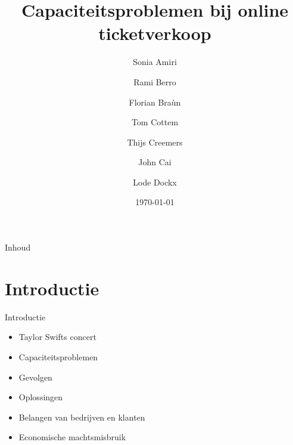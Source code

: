 \documentclass{beamer}
\title{Capaciteitsproblemen bij online ticketverkoop}
\author{Sonia Amiri \and Rami Berro \and Florian Braùn \and Tom Cottem \and Thijs Creemers \and John Cai \and Lode Dockx}
\date{\today}
\begin{document}
\begin{frame}
  \titlepage
\end{frame}

\begin{frame}{Inhoud}
  \tableofcontents
\end{frame}

\section[Intro]{Introductie}
\begin{frame}{Introductie}
    \begin{itemize}
        \item Taylor Swifts concert
        \item Capaciteitsproblemen
        \item Gevolgen
        \item Oplossingen
        \item Belangen van bedrijven en klanten
        \item Economische machtsmisbruik
    \end{itemize}
\end{frame}
\end{document}
